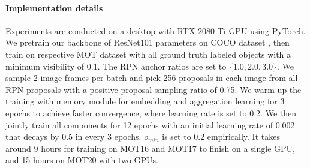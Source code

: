 \documentclass[final]{cvpr}
\begin{document}
\paragraph{Implementation details}
Experiments are conducted on a desktop with RTX 2080 Ti GPU using PyTorch. We pretrain our backbone of ResNet101 \cite{He2016} parameters on COCO dataset \cite{Lin2014}, then train on respective MOT dataset with all ground truth labeled objects with a minimum visibility of 0.1. The RPN anchor ratios are set to \(\{1.0, 2.0, 3.0\}\).
We sample 2 image frames per batch and pick 256 proposals in each image from all RPN proposals with a positive proposal sampling ratio of 0.75.
We warm up the training with memory module for embedding and aggregation learning for 3 epochs to achieve faster convergence, where learning rate is set to 0.2. We then jointly train all components for 12 epochs with an initial learning rate of 0.002 that decays by 0.5 in every 3 epochs. \(o_{min}\) is set to 0.2 empirically.
It takes around 9 hours for training on MOT16 and MOT17 to finish on a single GPU, and 15 hours on MOT20 with two GPUs.
\end{document}
